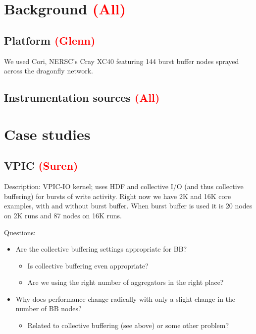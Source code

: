 \documentclass[conference,10pt,compsocconf]{IEEEtran}
\newcommand{\assign}[1]{\textcolor{red}{(#1)}}
\begin{document}
\section{Background \assign{All}}

\subsection{Platform \assign{Glenn}}

We used Cori, NERSC's Cray XC40 featuring 144 burst buffer nodes sprayed
across the dragonfly network.

\subsection{Instrumentation sources \assign{All}}

\section{Case studies}

\subsection{VPIC \assign{Suren}}

Description: VPIC-IO kernel; uses HDF and collective I/O (and thus collective
buffering) for bursts of write activity.  Right now we have 2K and 16K core
examples, with and without burst buffer.  When burst buffer is used it is 20
nodes on 2K runs and 87 nodes on 16K runs.

Questions:
\begin{itemize}
\item Are the collective buffering settings appropriate for BB?
    \begin{itemize}
    \item Is collective buffering even appropriate?
    \item Are we using the right number of aggregators in the right place?
    \end{itemize}
\item Why does performance change radically with only a slight change in the
number of BB nodes?
    \begin{itemize}
    \item Related to collective buffering (see above) or some other problem?
    \end{itemize}
\end{itemize}
\end{document}
